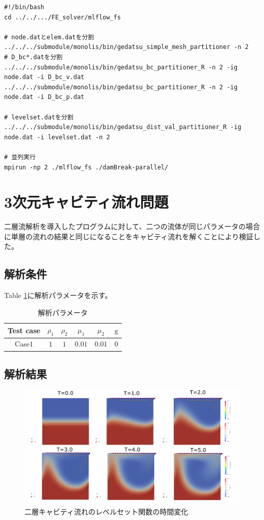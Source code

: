 \documentclass[8pt,a4paper]{article}
\begin{document}
\begin{lstlisting}[]
#!/bin/bash
cd ../../.../FE_solver/mlflow_fs

# node.datとelem.datを分割
../../../submodule/monolis/bin/gedatsu_simple_mesh_partitioner -n 2
# D_bc*.datを分割
../../../submodule/monolis/bin/gedatsu_bc_partitioner_R -n 2 -ig node.dat -i D_bc_v.dat
../../../submodule/monolis/bin/gedatsu_bc_partitioner_R -n 2 -ig node.dat -i D_bc_p.dat

# levelset.datを分割
../../../submodule/monolis/bin/gedatsu_dist_val_partitioner_R -ig node.dat -i levelset.dat -n 2

# 並列実行
mpirun -np 2 ./mlflow_fs ./damBreak-parallel/

\end{lstlisting}

\newpage
\section{3次元キャビティ流れ問題}
二層流解析を導入したプログラムに対して、二つの流体が同じパラメータの場合に単層の流れの結果と同じになることをキャビティ流れを解くことにより検証した。

\subsection{解析条件}
Table \ref{table:fluid-ml-cavity-parameter}に解析パラメータを示す。

\renewcommand{\arraystretch}{1}
\begin{table}[H]
	\centering
	\caption{解析パラメータ}
	\begin{tabular}{cccccc}
		\hline
		Test case & $\rho_1$ & $\rho_2$ & $\mu_1$ & $\mu_2$ & $\mathrm{g}$\\
		\hline 
		Case$1$ & $1$ & $1$ & $0.01$ & $0.01$   & $0$ \\
		\hline         
	\end{tabular}
	\label{table:fluid-ml-cavity-parameter}
\end{table}
\renewcommand{\arraystretch}{1.0}

\subsection{解析結果}
\begin{figure}[H]
	\centering
	\includegraphics[width=18truecm]{pics/3d-cavity/levelset_velocity.pdf}
	\caption{二層キャビティ流れのレベルセット関数の時間変化}
	\label{fig:3d-bubble-levelset_t0-3}
\end{figure}
\end{document}
